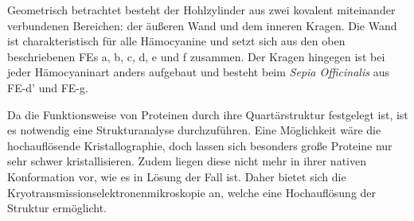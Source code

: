 Geometrisch betrachtet besteht der Hohlzylinder aus zwei kovalent miteinander verbundenen Bereichen: der äußeren Wand und dem inneren Kragen.
Die Wand ist charakteristisch für alle Hämocyanine und setzt sich aus den oben beschriebenen FEs a, b, c, d, e und f zusammen.
Der Kragen hingegen ist bei jeder Hämocyaninart anders aufgebaut und besteht beim \textit{Sepia Officinalis} aus FE-d' und FE-g.

Da die Funktionsweise von Proteinen durch ihre Quartärstruktur festgelegt ist, ist es notwendig eine Strukturanalyse durchzuführen.
Eine Möglichkeit wäre die hochauflösende Kristallographie, doch lassen sich besonders große Proteine nur sehr schwer kristallisieren.
Zudem liegen diese nicht mehr in ihrer nativen Konformation vor, wie es in Lösung der Fall ist.
Daher bietet sich die Kryotransmissionselektronenmikroskopie an, welche eine Hochauflösung der Struktur ermöglicht.

\FloatBarrier